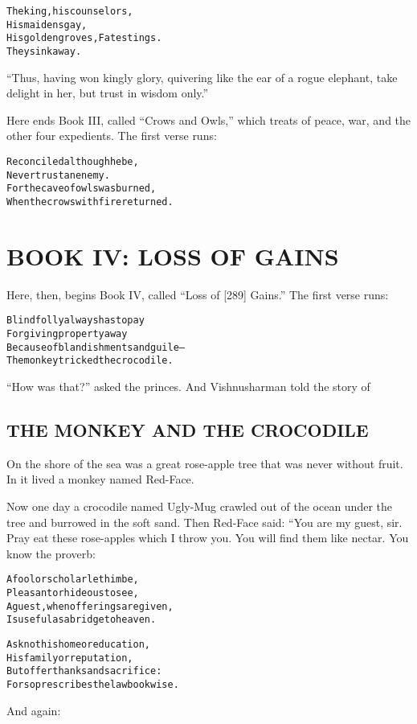 \documentclass{article}
\renewenvironment{verbatim}{\begin{alltt}\normalfont\begin{centering}}{\end{centering}\end{alltt}}
\begin{document}
\begin{verbatim}
The king, his counselors,
    His maidens gay,
His golden groves, Fate stings.
    They sink away.
\end{verbatim}
``Thus, having won kingly glory, quivering like the ear of a rogue elephant, take delight in her, but trust in wisdom only.''

Here ends Book III, called ``Crows and Owls,'' which treats of
peace, war, and the other four expedients. The first verse runs:

\begin{verbatim}
Reconciled although he be,
Never trust an enemy.
For the cave of owls was burned,
When the crows with fire returned.                      
\end{verbatim}
\section{BOOK IV: LOSS OF GAINS}

Here, then, begins Book IV, called ``Loss of [289] Gains.'' The
first verse runs:

\begin{verbatim}
Blind folly always has to pay
For giving property away
Because of blandishments and guile--
The monkey tricked the crocodile.
\end{verbatim}
``How was that?'' asked the princes. And Vishnusharman told the
story of

\subsection{THE MONKEY AND THE CROCODILE}

On the shore of the sea was a great rose-apple tree that was never
without fruit. In it lived a monkey named Red-Face.

Now one day a crocodile named Ugly-Mug crawled out of the ocean
under the tree and burrowed in the soft sand. Then Red-Face said:
“You are my guest, sir. Pray eat these rose-apples which I throw
you. You will find them like nectar. You know the proverb:

\begin{verbatim}
A fool or scholar let him be,
Pleasant or hideous to see,
A guest, when offerings are given,
Is useful as a bridge to heaven.

Ask not his home or education,
His family or reputation,
But offer thanks and sacrifice:
For so prescribes the lawbook wise.
\end{verbatim}
And again:
\end{document}
